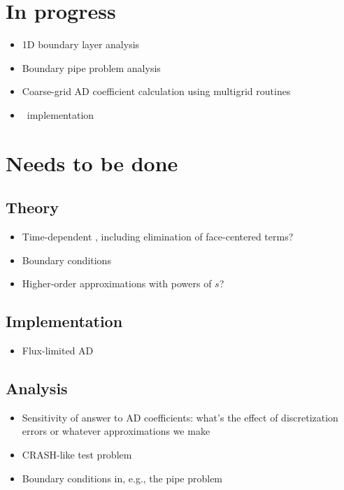 \documentclass[11pt]{SRJresearch}
\begin{document}
\section{In progress}

\begin{itemize}
  \item 1D boundary layer analysis
  \item Boundary pipe problem analysis
  \item Coarse-grid AD coefficient calculation using multigrid routines
  \item \APone\ implementation 
\end{itemize}

\section{Needs to be done}

\subsection{Theory}
\begin{itemize}
  \item Time-dependent \Pone, including elimination of face-centered terms?
  \item Boundary conditions
  \item Higher-order approximations with powers of $s$?
\end{itemize}

\subsection{Implementation}
\begin{itemize}
  \item Flux-limited AD
\end{itemize}

\subsection{Analysis}
\begin{itemize}
  \item Sensitivity of answer to AD coefficients: what's the effect of
    discretization errors or whatever approximations we make
  \item CRASH-like test problem
  \item Boundary conditions in, e.g., the pipe problem
\end{itemize}


\end{document}
